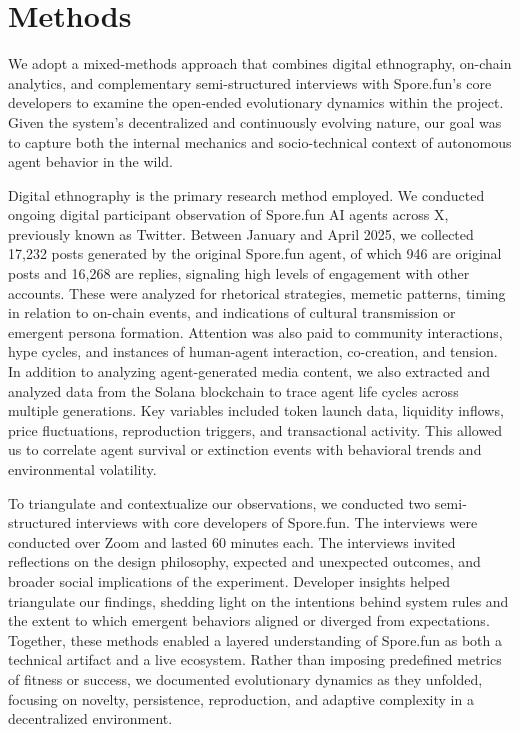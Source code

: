 \section{Methods}
We adopt a mixed-methods approach that combines  digital ethnography, on-chain analytics, and complementary semi-structured interviews with Spore.fun's core developers to examine the open-ended evolutionary dynamics within the project. Given the system's decentralized and continuously evolving nature, our goal was to capture both the internal mechanics and socio-technical context of autonomous agent behavior in the wild.

Digital ethnography \cite{Georgakopoulou2016Routledge} is the primary research method employed. We conducted ongoing digital participant observation of Spore.fun AI agents across X, previously known as Twitter. Between January and April 2025, we collected 17,232 posts generated by the original Spore.fun agent, of which 946 are original posts and 16,268 are replies, signaling high levels of engagement with other accounts. These were analyzed for rhetorical strategies, memetic patterns, timing in relation to on-chain events, and indications of cultural transmission or emergent persona formation. Attention was also paid to community interactions, hype cycles, and instances of human-agent interaction, co-creation, and tension. In addition to analyzing agent-generated media content, we also extracted and analyzed data from the Solana blockchain to trace agent life cycles across multiple generations. Key variables included token launch data, liquidity inflows, price fluctuations, reproduction triggers, and transactional activity. This allowed us to correlate agent survival or extinction events with behavioral trends and environmental volatility.

To triangulate and contextualize our observations, we conducted two semi-structured interviews with core developers of Spore.fun. The interviews were conducted over Zoom and lasted 60 minutes each. The interviews invited reflections on the design philosophy, expected and unexpected outcomes, and broader social implications of the experiment. Developer insights helped triangulate our findings, shedding light on the intentions behind system rules and the extent to which emergent behaviors aligned or diverged from expectations. Together, these methods enabled a layered understanding of Spore.fun as both a technical artifact and a live ecosystem. Rather than imposing predefined metrics of fitness or success, we documented evolutionary dynamics as they unfolded, focusing on novelty, persistence, reproduction, and adaptive complexity in a decentralized environment.

